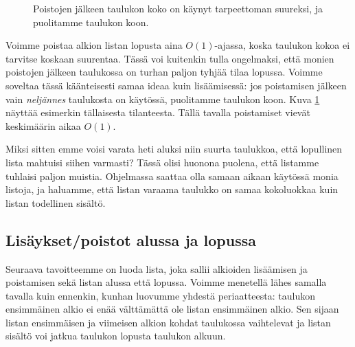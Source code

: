 \begin{figure}
\center
{}
\caption{Poistojen jälkeen taulukon koko on käynyt tarpeettoman suureksi,
ja puolitamme taulukon koon.}                                                                        
\label{fig:lispoi}
\end{figure}

Voimme poistaa alkion listan lopusta aina $O(1)$-ajassa,
koska taulukon kokoa ei tarvitse koskaan suurentaa.
Tässä voi kuitenkin tulla ongelmaksi, että monien poistojen
jälkeen taulukossa on turhan paljon tyhjää tilaa lopussa.
Voimme soveltaa tässä käänteisesti samaa ideaa kuin lisäämisessä:
jos poistamisen jälkeen vain \emph{neljännes} taulukosta on käytössä,
puolitamme taulukon koon.
Kuva \ref{fig:lispoi} näyttää esimerkin tällaisesta tilanteesta.
Tällä tavalla poistamiset vievät keskimäärin aikaa $O(1)$.

Miksi sitten emme voisi varata heti aluksi niin suurta taulukkoa,
että lopullinen lista mahtuisi siihen varmasti?
Tässä olisi huonona puolena, että listamme tuhlaisi paljon muistia.
Ohjelmassa saattaa olla samaan aikaan käytössä monia listoja,
ja haluamme, että listan varaama taulukko on samaa kokoluokkaa
kuin listan todellinen sisältö.

\subsection{Lisäykset/poistot alussa ja lopussa}

Seuraava tavoitteemme on luoda lista,
joka sallii alkioiden lisäämisen ja poistamisen
sekä listan alussa että lopussa.
Voimme menetellä lähes samalla tavalla kuin ennenkin,
kunhan luovumme yhdestä periaatteesta:
taulukon ensimmäinen alkio ei enää välttämättä
ole listan ensimmäinen alkio.
Sen sijaan listan ensimmäisen ja
viimeisen alkion kohdat taulukossa vaihtelevat ja listan sisältö
voi jatkua taulukon lopusta taulukon alkuun.

